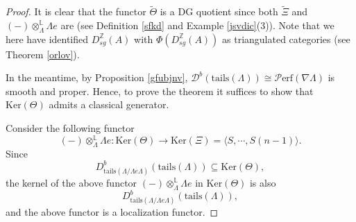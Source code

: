 \documentclass[11pt,reqno]{amsart}
\theoremstyle{definition}
\begin{document}
\begin{proof}

It is clear that the functor $\tilde{\Theta}$ is a DG quotient since 
both $\tilde\Xi$ and $(-) \otimes^{\mathbb{L}}_{\Lambda} \Lambda e$ 
are (see Definition \ref{sfkd} and Example \ref{jsvdic}(3)). 
Note that we here have identified 
$D^{\mathbb{Z}}_{sg}(A)$ with $ \Phi(D^{\mathbb{Z}}_{sg}(A))$ 
as triangulated categories (see Theorem \ref{orlov}).
 
In the meantime, by Proposition \ref{gfubjnv}, 
$\mathcal{D}^{b}(\mathrm{tails}(\Lambda)) \cong 
\mathcal{P}\mathrm{erf}(\nabla \Lambda)$ 
is smooth and proper. 
Hence, to prove the theorem
it suffices to show that $\mathrm{Ker}(\Theta)$ admits a classical generator.



Consider the following functor
$$
(-) \otimes^{\mathbb{L}}_{\Lambda} \Lambda 
e: \mathrm{Ker}(\Theta) \rightarrow \mathrm{Ker}(\Xi) 
= \langle S, \cdots, S(n-1)\rangle.
$$
Since
$$
D_{\mathrm{tails}(\Lambda / \Lambda e \Lambda )}^{b}
(\mathrm{tails}(\Lambda)) \subseteq  \mathrm{Ker}(\Theta), 
$$
the kernel of the above functor $(-) \otimes^{\mathbb{L}}_{\Lambda} \Lambda e$ 
in $\mathrm{Ker}(\Theta)$ is also
$$
 D_{\mathrm{tails}(\Lambda / \Lambda e \Lambda )}^{b}(\mathrm{tails}(\Lambda)),
$$
and the above functor is a localization functor.


\end{proof}
\end{document}
